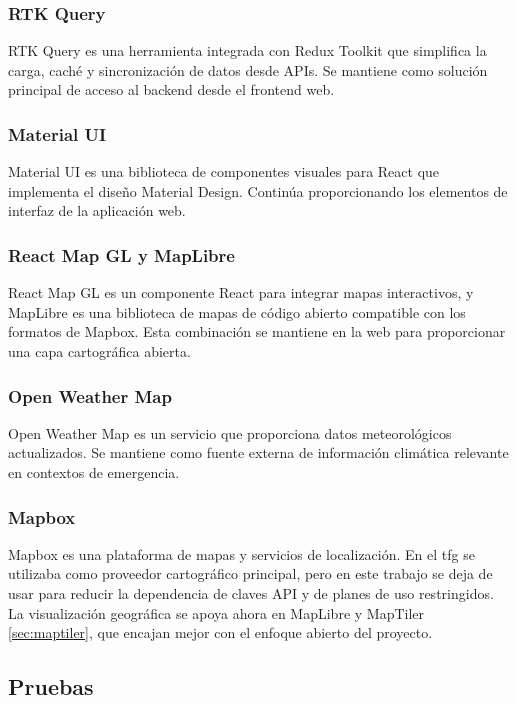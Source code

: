 \subsubsection{RTK Query}
RTK Query \cite{rtkquery} es una herramienta integrada con Redux Toolkit que simplifica la carga, caché y sincronización de datos desde APIs. Se mantiene como solución principal de acceso al backend desde el frontend web.

\subsubsection{Material UI}
Material UI \cite{materialui} es una biblioteca de componentes visuales para React que implementa el diseño Material Design. Continúa proporcionando los elementos de interfaz de la aplicación web.

\subsubsection{React Map GL y MapLibre}
React Map GL \cite{reactmapgl} es un componente React para integrar mapas interactivos, y MapLibre \cite{maplibre} es una biblioteca de mapas de código abierto compatible con los formatos de Mapbox. Esta combinación se mantiene en la web para proporcionar una capa cartográfica abierta.

\subsubsection{Open Weather Map}
Open Weather Map \cite{openweathermap} es un servicio que proporciona datos meteorológicos actualizados. Se mantiene como fuente externa de información climática relevante en contextos de emergencia.

\subsubsection{Mapbox}
\label{sec:mapbox}
Mapbox \cite{mapbox} es una plataforma de mapas y servicios de localización. En el \acrshort{tfg} se utilizaba como proveedor cartográfico principal, pero en este trabajo se deja de usar para reducir la dependencia de claves API y de planes de uso restringidos. La visualización geográfica se apoya ahora en MapLibre y MapTiler \ref{sec:maptiler}, que encajan mejor con el enfoque abierto del proyecto.

\subsection{Pruebas}

